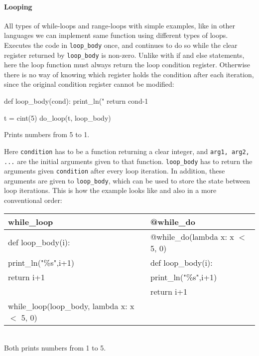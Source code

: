 \paragraph{Looping}
All types of while-loops and range-loops with simple examples, like in other languages we can implement same function using different types of loops.
Executes the code in \verb|loop_body| once, and continues to do so while the clear register returned by \verb|loop_body| is non-zero. Unlike with if and else statements, here the loop function must always return the loop condition register. Otherwise there is no way of knowing which register holds the condition after each iteration, since the original condition register cannot be modified: 
\begin{mylisting}
def loop_body(cond):
    print_ln("%
    return cond-1

t = cint(5)
do_loop(t, loop_body)
\end{mylisting}
\begin{footnotesize}
Prints numbers from 5 to 1.
\end{footnotesize}

Here \verb+condition+ has to be a function returning a clear integer, and \verb+arg1, arg2, ...+ are the initial arguments given to that
function. \verb+loop_body+ has to return the arguments given \verb+condition+ after every loop iteration. In addition, these arguments are given to \verb+loop_body+, which can be used to store the state between loop iterations. This is how the example looks like and also in a more conventional order:

\begin{center}
\begin{tabular}{|l|l|} \hline
\textbf{while_loop}                         & \textbf{@while_do}                \\ \hline
def loop_body(i):                           & @while_do(lambda x: x $<$ 5, 0)  \\
\hspace{5 mm}print_ln("\%s",i+1)            & def loop_body(i):                \\
\hspace{5 mm}return i+1                     & \hspace{5 mm}print_ln("\%s",i+1) \\
                                            & \hspace{5 mm}return i+1          \\
while_loop(loop_body, lambda x: x $<$ 5, 0) &                                  \\ \hline
\end{tabular}
\begin{footnotesize}
\\ Both prints numbers from 1 to 5.
\end{footnotesize}
\end{center}

